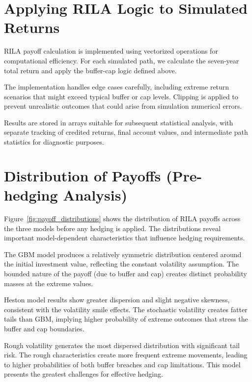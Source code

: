 \documentclass[12pt,a4paper]{report}
\begin{document}
\section{Applying RILA Logic to Simulated Returns}

RILA payoff calculation is implemented using vectorized operations for computational efficiency. For each simulated path, we calculate the seven-year total return and apply the buffer-cap logic defined above.

The implementation handles edge cases carefully, including extreme return scenarios that might exceed typical buffer or cap levels. Clipping is applied to prevent unrealistic outcomes that could arise from simulation numerical errors.

Results are stored in arrays suitable for subsequent statistical analysis, with separate tracking of credited returns, final account values, and intermediate path statistics for diagnostic purposes.

\section{Distribution of Payoffs (Pre-hedging Analysis)}

Figure~\ref{fig:payoff_distributions} shows the distribution of RILA payoffs across the three models before any hedging is applied. The distributions reveal important model-dependent characteristics that influence hedging requirements.


The GBM model produces a relatively symmetric distribution centered around the initial investment value, reflecting the constant volatility assumption. The bounded nature of the payoff (due to buffer and cap) creates distinct probability masses at the extreme values.

Heston model results show greater dispersion and slight negative skewness, consistent with the volatility smile effects. The stochastic volatility creates fatter tails than GBM, implying higher probability of extreme outcomes that stress the buffer and cap boundaries.

Rough volatility generates the most dispersed distribution with significant tail risk. The rough characteristics create more frequent extreme movements, leading to higher probabilities of both buffer breaches and cap limitations. This model presents the greatest challenges for effective hedging.
\end{document}
